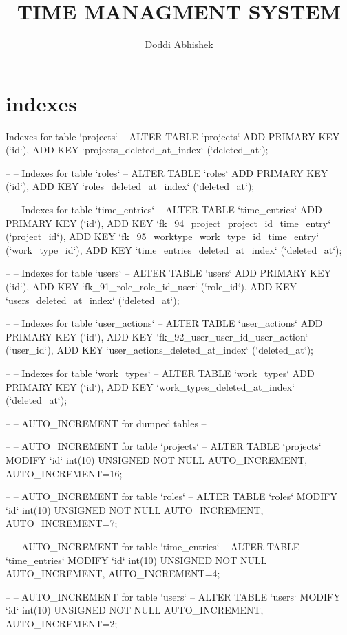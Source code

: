 \documentclass{article}
\title{TIME MANAGMENT SYSTEM}
\author{Doddi Abhishek}
\begin{document}
\maketitle







\section{indexes}
Indexes for table `projects`
--
ALTER TABLE `projects`
  ADD PRIMARY KEY (`id`),
  ADD KEY `projects_deleted_at_index` (`deleted_at`);

--
-- Indexes for table `roles`
--
ALTER TABLE `roles`
  ADD PRIMARY KEY (`id`),
  ADD KEY `roles_deleted_at_index` (`deleted_at`);

--
-- Indexes for table `time_entries`
--
ALTER TABLE `time_entries`
  ADD PRIMARY KEY (`id`),
  ADD KEY `fk_94_project_project_id_time_entry` (`project_id`),
  ADD KEY `fk_95_worktype_work_type_id_time_entry` (`work_type_id`),
  ADD KEY `time_entries_deleted_at_index` (`deleted_at`);

--
-- Indexes for table `users`
--
ALTER TABLE `users`
  ADD PRIMARY KEY (`id`),
  ADD KEY `fk_91_role_role_id_user` (`role_id`),
  ADD KEY `users_deleted_at_index` (`deleted_at`);

--
-- Indexes for table `user_actions`
--
ALTER TABLE `user_actions`
  ADD PRIMARY KEY (`id`),
  ADD KEY `fk_92_user_user_id_user_action` (`user_id`),
  ADD KEY `user_actions_deleted_at_index` (`deleted_at`);

--
-- Indexes for table `work_types`
--
ALTER TABLE `work_types`
  ADD PRIMARY KEY (`id`),
  ADD KEY `work_types_deleted_at_index` (`deleted_at`);

--
-- AUTO_INCREMENT for dumped tables
--

--
-- AUTO_INCREMENT for table `projects`
--
ALTER TABLE `projects`
  MODIFY `id` int(10) UNSIGNED NOT NULL AUTO_INCREMENT, AUTO_INCREMENT=16;

--
-- AUTO_INCREMENT for table `roles`
--
ALTER TABLE `roles`
  MODIFY `id` int(10) UNSIGNED NOT NULL AUTO_INCREMENT, AUTO_INCREMENT=7;

--
-- AUTO_INCREMENT for table `time_entries`
--
ALTER TABLE `time_entries`
  MODIFY `id` int(10) UNSIGNED NOT NULL AUTO_INCREMENT, AUTO_INCREMENT=4;

--
-- AUTO_INCREMENT for table `users`
--
ALTER TABLE `users`
  MODIFY `id` int(10) UNSIGNED NOT NULL AUTO_INCREMENT, AUTO_INCREMENT=2;
\end{document}

